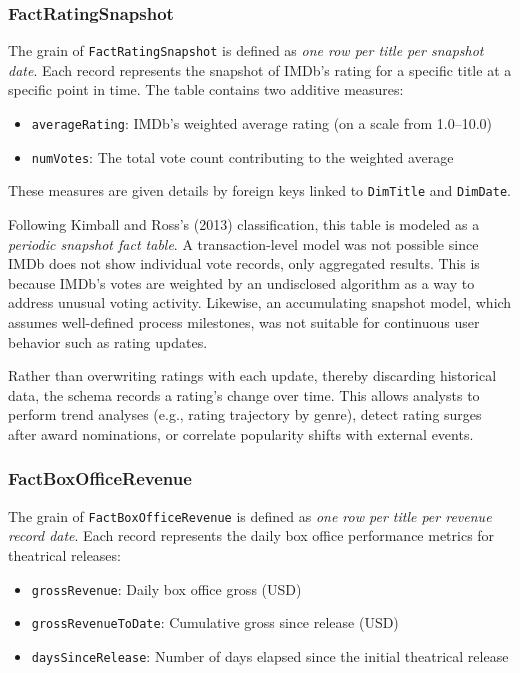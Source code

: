 \subsubsection{FactRatingSnapshot}

The grain of \texttt{FactRatingSnapshot} is defined as \textit{one row per title per snapshot date}. Each record represents the snapshot of IMDb's rating for a specific title at a specific point in time. The table contains two additive measures:

\begin{itemize}
    \item \texttt{averageRating}: IMDb's weighted average rating (on a scale from 1.0–10.0)
    \item \texttt{numVotes}: The total vote count contributing to the weighted average
\end{itemize}

These measures are given details by foreign keys linked to \texttt{DimTitle} and \texttt{DimDate}.

Following Kimball and Ross’s (2013) classification, this table is modeled as a \textit{periodic snapshot fact table}. A transaction-level model was not possible since IMDb does not show individual vote records, only aggregated results. This is because IMDb's votes are weighted by an undisclosed algorithm as a way to address unusual voting activity. Likewise, an accumulating snapshot model, which assumes well-defined process milestones, was not suitable for continuous user behavior such as rating updates.

Rather than overwriting ratings with each update, thereby discarding historical data, the schema records a rating's change over time. This allows analysts to perform trend analyses (e.g., rating trajectory by genre), detect rating surges after award nominations, or correlate popularity shifts with external events.

\subsubsection{FactBoxOfficeRevenue}

The grain of \texttt{FactBoxOfficeRevenue} is defined as \textit{one row per title per revenue record date}. Each record represents the daily box office performance metrics for theatrical releases:

\begin{itemize}
    \item \texttt{grossRevenue}: Daily box office gross (USD)
    \item \texttt{grossRevenueToDate}: Cumulative gross since release (USD)
    \item \texttt{daysSinceRelease}: Number of days elapsed since the initial theatrical release
\end{itemize}

